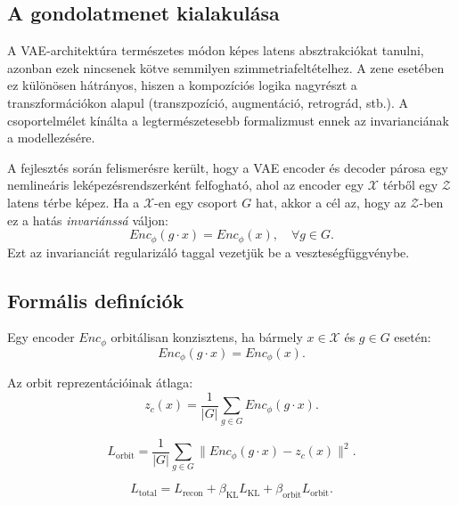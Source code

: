 \subsection{A gondolatmenet kialakulása}

A VAE-architektúra természetes módon képes latens absztrakciókat tanulni, azonban ezek nincsenek kötve semmilyen szimmetriafeltételhez.  
A zene esetében ez különösen hátrányos, hiszen a kompozíciós logika nagyrészt a transzformációkon alapul (transzpozíció, augmentáció, retrográd, stb.).  
A csoportelmélet \cite{Armstrong1988} kínálta a legtermészetesebb formalizmust ennek az invarianciának a modellezésére.

A fejlesztés során felismerésre került, hogy a VAE encoder és decoder párosa egy nemlineáris leképezésrendszerként felfogható, ahol az encoder egy \(\mathcal{X}\) térből egy \(\mathcal{Z}\) latens térbe képez.  
Ha a \(\mathcal{X}\)-en egy csoport \(G\) hat, akkor a cél az, hogy az \(\mathcal{Z}\)-ben ez a hatás \emph{invariánssá} váljon:
\[
Enc_\phi(g \cdot x) = Enc_\phi(x), \quad \forall g \in G.
\]
Ezt az invarianciát regularizáló taggal vezetjük be a veszteségfüggvénybe.

\subsection{Formális definíciók}

\begin{definition}
Egy encoder \(Enc_\phi\) orbitálisan konzisztens, ha bármely \(x \in \mathcal{X}\) és \(g \in G\) esetén:
\[
Enc_\phi(g \cdot x) = Enc_\phi(x).
\]
\end{definition}

\begin{definition}
Az orbit reprezentációinak átlaga:
\[
z_c(x) = \frac{1}{|G|} \sum_{g\in G} Enc_\phi(g\cdot x).
\]
\end{definition}

\begin{definition}
\[
L_{\text{orbit}} = \frac{1}{|G|} \sum_{g\in G} \|Enc_\phi(g\cdot x) - z_c(x)\|^2.
\]
\end{definition}

\begin{definition}
\[
L_{\text{total}} = L_{\text{recon}} + \beta_{\text{KL}} L_{\text{KL}} + \beta_{\text{orbit}} L_{\text{orbit}}.
\]
\end{definition}

